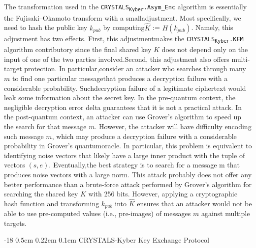 \documentclass[runningheads]{llncs}
\makeatletter
\renewcommand\subsubsection{\@startsection{subsubsection}{3}{\z@}%
                       {-18\p@ \@plus -4\p@ \@minus -4\p@}%
                       {0.5em \@plus 0.22em \@minus 0.1em}%
                       {\normalfont\normalsize\bfseries\boldmath}}
\numberwithin{equation}{section}
\makeatother
\begin{document}
    The transformation used in the \texorpdfstring{\texttt{CRYSTALS}\textsubscript{\texttt{Kyber}}\texttt{.Asym\_Enc}}\/ algorithm is essentially the Fujisaki–Okamoto transform with a small\break adjustment. Most specifically, we need to hash the public key ${k}_{pub}$ by computing\break $\hat{K}$ := $H( {k}_{pub} )$. Namely, this adjustment has two effects. First, this adjustment\break makes the \texorpdfstring{\texttt{CRYSTALS}\textsubscript{\texttt{Kyber}}\texttt{.KEM}}\/ algorithm contributory since the final shared key $K$ does not depend only on the input of one of the two parties involved.\break Second, this adjustment also offers multi-target protection. In particular,\break consider an attacker who searches through many $m$ to find one particular message\break that produces a decryption failure with a considerable probability. Such\break decryption failure of a legitimate ciphertext would leak some information about the secret key. In the pre-quantum context, the negligible decryption error delta guarantees that it is not a practical attack. In the post-quantum context, an attacker can use Grover's algorithm to speed up the search for that message $m$. However, the attacker will have difficulty encoding such message $m$, which may produce a decryption failure with a considerable probability in Grover's quantum\break oracle. In particular, this problem is equivalent to identifying noise vectors that likely have a large inner product with the tuple of vectors $(s, e)$. Eventually,\break the best strategy is to search for a message m that produces noise vectors with a large norm. This attack probably does not offer any better performance than a brute-force attack performed by Grover's algorithm for searching the shared key $K$ with 256 bits. However, applying a cryptographic hash function and transforming ${k}_{pub}$ into $\hat{K}$ ensures that an attacker would not be able to use pre-computed values (i.e., pre-images) of messages $m$ against multiple targets.

    
    
    \subsubsection{CRYSTALS-Kyber Key Exchange Protocol}
    \label{subsubsec:crystals-kyber-key-exchange-protocol}
\end{document}

